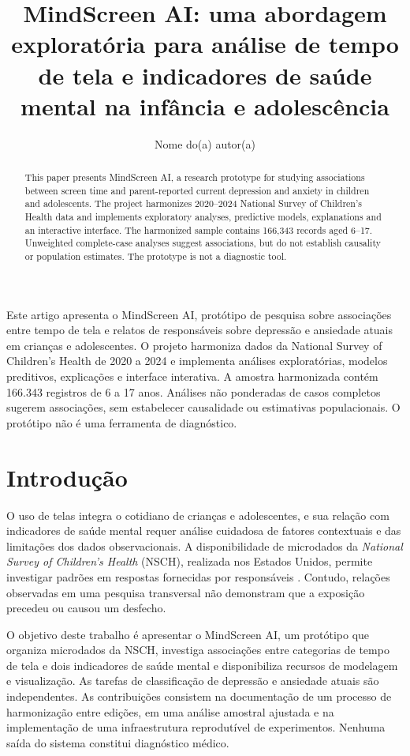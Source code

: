 \documentclass[12pt]{article}
\title{MindScreen AI: uma abordagem exploratória para análise de tempo de tela e indicadores de saúde mental na infância e adolescência}
\author{Nome do(a) autor(a)\inst{1}}
\begin{document}
\maketitle

\begin{abstract}
This paper presents MindScreen AI, a research prototype for studying associations between screen time and parent-reported current depression and anxiety in children and adolescents. The project harmonizes 2020--2024 National Survey of Children's Health data and implements exploratory analyses, predictive models, explanations and an interactive interface. The harmonized sample contains 166,343 records aged 6--17. Unweighted complete-case analyses suggest associations, but do not establish causality or population estimates. The prototype is not a diagnostic tool.
\end{abstract}

\begin{resumo}
Este artigo apresenta o MindScreen AI, protótipo de pesquisa sobre associações entre tempo de tela e relatos de responsáveis sobre depressão e ansiedade atuais em crianças e adolescentes. O projeto harmoniza dados da National Survey of Children's Health de 2020 a 2024 e implementa análises exploratórias, modelos preditivos, explicações e interface interativa. A amostra harmonizada contém 166.343 registros de 6 a 17 anos. Análises não ponderadas de casos completos sugerem associações, sem estabelecer causalidade ou estimativas populacionais. O protótipo não é uma ferramenta de diagnóstico.
\end{resumo}

\section{Introdução}
O uso de telas integra o cotidiano de crianças e adolescentes, e sua relação com indicadores de saúde mental requer análise cuidadosa de fatores contextuais e das limitações dos dados observacionais. A disponibilidade de microdados da \textit{National Survey of Children's Health} (NSCH), realizada nos Estados Unidos, permite investigar padrões em respostas fornecidas por responsáveis \cite{census2020,census2024}. Contudo, relações observadas em uma pesquisa transversal não demonstram que a exposição precedeu ou causou um desfecho.

O objetivo deste trabalho é apresentar o MindScreen AI, um protótipo que organiza microdados da NSCH, investiga associações entre categorias de tempo de tela e dois indicadores de saúde mental e disponibiliza recursos de modelagem e visualização. As tarefas de classificação de depressão e ansiedade atuais são independentes. As contribuições consistem na documentação de um processo de harmonização entre edições, em uma análise amostral ajustada e na implementação de uma infraestrutura reprodutível de experimentos. Nenhuma saída do sistema constitui diagnóstico médico.
\end{document}
